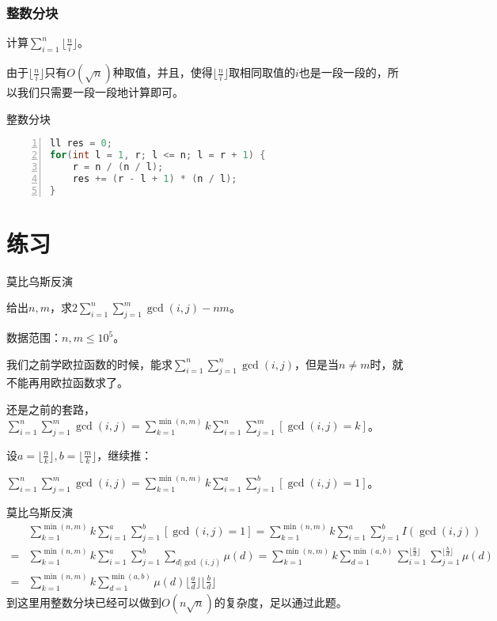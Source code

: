 \documentclass{ctexbeamer}        %
\begin{document}
\begin{frame}[fragile]
\frametitle{整数分块}

\begin{example}[计算下取整分式的和式]
    计算$\sum_{i=1}^n \lfloor \frac{n}{i} \rfloor$。
\end{example}

由于$\lfloor \frac{n}{i} \rfloor$只有$O(\sqrt{n})$种取值，并且，使得$\lfloor \frac{n}{i} \rfloor$取相同取值的$i$也是一段一段的，所以我们只需要一段一段地计算即可。

\begin{block}{整数分块}
\begin{lstlisting}[language={c++},
                   numbers=left]
ll res = 0;
for(int l = 1, r; l <= n; l = r + 1) {
    r = n / (n / l);
    res += (r - l + 1) * (n / l);
}
\end{lstlisting}
\end{block}

\end{frame}

\section{练习}

\begin{frame}{莫比乌斯反演}
\begin{example}[accoders3465]
    给出$n,m$，求$2\sum_{i=1}^n\sum_{j=1}^m \gcd(i,j) - nm$。

    数据范围：$n,m \le 10^5$。
\end{example}
\pause
我们之前学欧拉函数的时候，能求$\sum_{i=1}^n\sum_{j=1}^n \gcd(i,j)$，但是当$n\neq m$时，就不能再用欧拉函数求了。

还是之前的套路，$\sum_{i=1}^n\sum_{j=1}^m \gcd(i,j)=\sum_{k=1}^{\min(n,m)}k\sum_{i=1}^n\sum_{j=1}^m [\gcd(i,j)=k]$。

设$a=\lfloor \frac{n}{k} \rfloor,b=\lfloor \frac{m}{k} \rfloor$，继续推：

$\sum_{i=1}^n\sum_{j=1}^m \gcd(i,j)=\sum_{k=1}^{\min(n,m)}k\sum_{i=1}^a\sum_{j=1}^b [\gcd(i,j)=1]$。
\end{frame}

\begin{frame}{莫比乌斯反演}
\begin{align*}
    &\sum_{k=1}^{\min(n,m)}k\sum_{i=1}^a\sum_{j=1}^b [\gcd(i,j)=1]=\sum_{k=1}^{\min(n,m)}k\sum_{i=1}^a\sum_{j=1}^b I(\gcd(i,j))\\
    =&\sum_{k=1}^{\min(n,m)}k\sum_{i=1}^a\sum_{j=1}^b \sum_{d|\gcd(i,j)} \mu(d)=\sum_{k=1}^{\min(n,m)}k\sum_{d=1}^{\min(a,b)}\sum_{i=1}^{\lfloor \frac{a}{d} \rfloor}\sum_{j=1}^{\lfloor \frac{b}{d} \rfloor}\mu(d)\\
    =&\sum_{k=1}^{\min(n,m)}k\sum_{d=1}^{\min(a,b)}\mu(d)\lfloor \frac{a}{d} \rfloor \lfloor \frac{b}{d} \rfloor
\end{align*}
到这里用整数分块已经可以做到$O(n\sqrt{n})$的复杂度，足以通过此题。
\end{frame}
\end{document}

